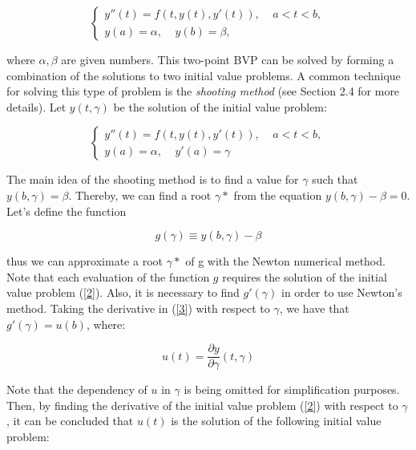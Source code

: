 \documentclass{article}
\begin{document}
    \begin{equation}\label{1}
        \begin{cases}
            y''(t)=f(t,y(t),y'(t)), \ \ \ \ \ a < t < b,\\
            y(a)=\alpha, \ \ \ \ \ y(b)=\beta,
        \end{cases}
    \end{equation}

where $\alpha, \beta$ are given numbers. This two-point BVP can be solved by forming a combination of the solutions to two initial value problems. A common technique for solving this type of problem is the \textit{shooting method} (see Section 2.4 for more details). Let $y(t,\gamma)$ be the solution of the initial value problem:
    
    \begin{equation}\label{2}
        \begin{cases}
            y''(t)=f(t,y(t),y'(t)),  \ \ \ \ \ a < t < b,\\
            y(a)=\alpha,  \ \ \ \ \ y'(a)=\gamma
        \end{cases}
    \end{equation}

The main idea of the shooting method is to find a value for $\gamma$ such that $y(b,\gamma)=\beta$. Thereby, we can find a root $\gamma*$ from the equation $y(b,\gamma)-\beta=0$. Let's define the function

    \begin{equation}\label{3}
        g(\gamma) \equiv y(b,\gamma) - \beta
    \end{equation}

thus we can approximate a root $\gamma*$ of g with the Newton numerical method. Note that each evaluation of the function $g$ requires the solution of the initial value problem (\ref{2}). Also, it is necessary to find $g'(\gamma)$ in order to use Newton's method. Taking the derivative in (\ref{3}) with respect to $\gamma$, we have that $g'(\gamma) = u(b)$, where:

    \begin{equation}\label{4}
        u(t)=\frac{\partial y}{\partial \gamma}(t,\gamma)
    \end{equation}

Note that the dependency of $u$ in $\gamma$ is being omitted for simplification purposes. Then, by finding the derivative of the initial value problem (\ref{2}) with respect to $\gamma$, it can be concluded that $u(t)$ is the solution of the following initial value problem:
\end{document}
